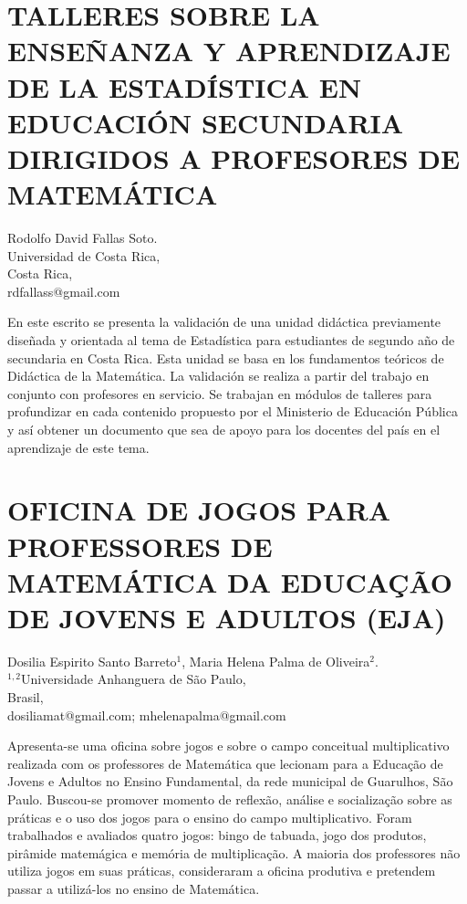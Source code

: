 \section{TALLERES SOBRE LA ENSEÑANZA Y APRENDIZAJE DE LA ESTADÍSTICA EN EDUCACIÓN
SECUNDARIA DIRIGIDOS A PROFESORES DE MATEMÁTICA}

\begin{datos}
Rodolfo David Fallas Soto.\\
Universidad de Costa Rica,\\
\hfill  Costa Rica, \\
\hfill rdfallass@gmail.com
\end{datos}

En este escrito se presenta la validación de una unidad didáctica
previamente diseñada y orientada al tema de Estadística para estudiantes
de segundo año de secundaria en Costa Rica. Esta unidad se basa en
los fundamentos teóricos de Didáctica de la Matemática. La validación
se realiza a partir del trabajo en conjunto con profesores en servicio.
Se trabajan en módulos de talleres para profundizar en cada contenido
propuesto por el Ministerio de Educación Pública y así obtener un
documento que sea de apoyo para los docentes del país en el aprendizaje
de este tema.


\section{\uppercase{ Oficina de jogos para professores de Matemática da Educação
de jovens e adultos (EJA)}}

\begin{datos}
Dosilia Espirito Santo Barreto$^1$, Maria Helena Palma de Oliveira$^2$.\\
$^{1,2}$Universidade Anhanguera de São Paulo,\\
\hfill   Brasil, \\
\hfill dosiliamat@gmail.com; mhelenapalma@gmail.com
\end{datos}

Apresenta-se uma oficina sobre jogos e sobre o campo conceitual multiplicativo
realizada com os professores de Matemática que lecionam para a Educação
de Jovens e Adultos no Ensino Fundamental, da rede municipal de Guarulhos,
São Paulo. Buscou-se promover momento de reflexão, análise e socialização
sobre as práticas e o uso dos jogos para o ensino do campo multiplicativo.
Foram trabalhados e avaliados quatro jogos: bingo de tabuada, jogo
dos produtos, pirâmide matemágica e memória de multiplicação. A maioria
dos professores não utiliza jogos em suas práticas, consideraram a
oficina produtiva e pretendem passar a utilizá-los no ensino de Matemática. 


